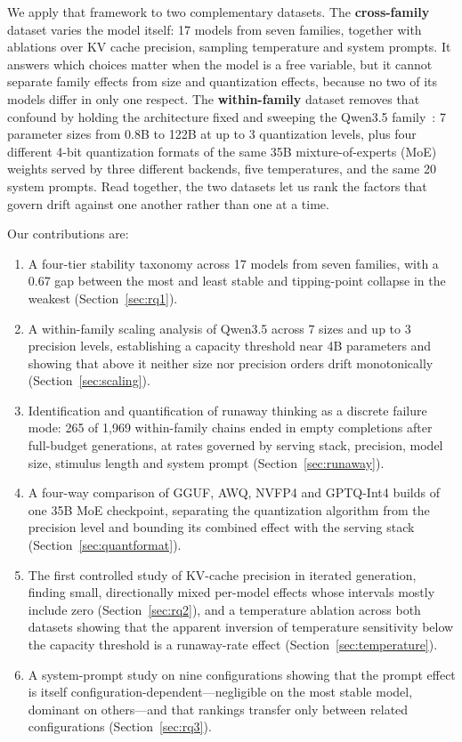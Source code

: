 \documentclass[11pt]{article}
\begin{document}
We apply that framework to two complementary datasets. The \textbf{cross-family}
dataset varies the model itself: 17 models from seven families, together with
ablations over KV cache precision, sampling temperature and system prompts. It
answers which choices matter when the model is a free variable, but it cannot
separate family effects from size and quantization effects, because no two of its
models differ in only one respect. The \textbf{within-family} dataset removes that
confound by holding the architecture fixed and sweeping the Qwen3.5
family~\citep{qwen2026qwen35}: 7 parameter sizes from 0.8B to 122B at up to 3
quantization levels, plus four different 4-bit quantization formats of the same
35B mixture-of-experts (MoE) weights served by three different backends, five
temperatures, and the same 20 system prompts. Read together, the two datasets let
us rank the factors that govern drift against one another rather than one at a
time.

Our contributions are:
\begin{enumerate}[leftmargin=*]
  \item A four-tier stability taxonomy across 17 models from seven families,
        with a 0.67 gap between the most and least stable and tipping-point
        collapse in the weakest (Section~\ref{sec:rq1}).
  \item A within-family scaling analysis of Qwen3.5 across 7 sizes and up to
        3 precision levels, establishing a capacity threshold near 4B
        parameters and showing that above it neither size nor precision
        orders drift monotonically (Section~\ref{sec:scaling}).
  \item Identification and quantification of runaway thinking as a discrete
        failure mode: 265 of 1{,}969 within-family chains ended in
        empty completions after full-budget generations, at rates governed by
        serving stack, precision, model size, stimulus length and system
        prompt (Section~\ref{sec:runaway}).
  \item A four-way comparison of GGUF, AWQ, NVFP4 and GPTQ-Int4 builds of one
        35B MoE checkpoint, separating the quantization algorithm from the
        precision level and bounding its combined effect with the serving
        stack (Section~\ref{sec:quantformat}).
  \item The first controlled study of KV-cache precision in iterated
        generation, finding small, directionally mixed per-model effects
        whose intervals mostly include zero (Section~\ref{sec:rq2}), and a
        temperature ablation across both datasets showing that the apparent
        inversion of temperature sensitivity below the capacity threshold is
        a runaway-rate effect (Section~\ref{sec:temperature}).
  \item A system-prompt study on nine configurations showing that the prompt
        effect is itself configuration-dependent---negligible on the most
        stable model, dominant on others---and that rankings transfer only
        between related configurations (Section~\ref{sec:rq3}).
\end{enumerate}
\end{document}
